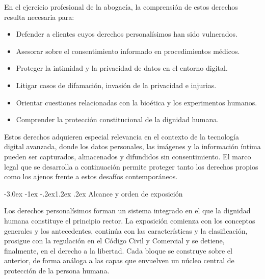 \documentclass[12pt,oneside]{book}
\makeatletter
\renewcommand\section{\@startsection{section}{1}{\z@}%
  {-3.0ex \@plus -1ex \@minus -.2ex}{1.2ex \@plus .2ex}%
  {\normalfont\large\bfseries\color{acento}}}
\makeatother
\begin{document}
En el ejercicio profesional de la abogacía, la comprensión de estos derechos resulta necesaria para:

\begin{itemize}
    \item Defender a clientes cuyos derechos personalísimos han sido vulnerados.
    \item Asesorar sobre el consentimiento informado en procedimientos médicos.
    \item Proteger la intimidad y la privacidad de datos en el entorno digital.
    \item Litigar casos de difamación, invasión de la privacidad e injurias.
    \item Orientar cuestiones relacionadas con la bioética y los experimentos humanos.
    \item Comprender la protección constitucional de la dignidad humana.
\end{itemize}

Estos derechos adquieren especial relevancia en el contexto de la tecnología digital avanzada, donde los datos personales, las imágenes y la información íntima pueden ser capturados, almacenados y difundidos sin consentimiento. El marco legal que se desarrolla a continuación permite proteger tanto los derechos propios como los ajenos frente a estos desafíos contemporáneos.

\section{Alcance y orden de exposición}

Los derechos personalísimos forman un sistema integrado en el que la dignidad humana constituye el principio rector. La exposición comienza con los conceptos generales y los antecedentes, continúa con las características y la clasificación, prosigue con la regulación en el Código Civil y Comercial y se detiene, finalmente, en el derecho a la libertad. Cada bloque se construye sobre el anterior, de forma análoga a las capas que envuelven un núcleo central de protección de la persona humana.

\end{document}
